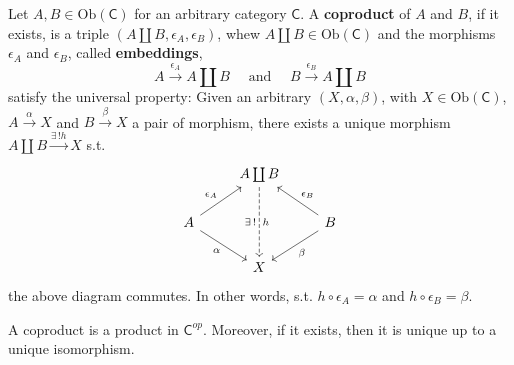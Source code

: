 \begin{defn}[Coproduct]
	Let $A,B \in \mathrm{Ob} \left(\mathsf{C}\right)$ for an arbitrary category $\mathsf{C}$.
	A \textbf{coproduct} of $A$ and $B$, if it exists, is a triple $\left(A \coprod B, \epsilon_A, \epsilon_B \right)$, whew $A \coprod B \in \mathrm{Ob} \left(\mathsf{C}\right)$ and the morphisms $\epsilon_A$ and $\epsilon_B$, called \textbf{embeddings}, 
	\begin{equation}
	A \xrightarrow{\epsilon_A} A \coprod B \quad \text{ and } \quad B \xrightarrow{\epsilon_B} A \coprod B
	\end{equation} 
	satisfy the universal property:
	Given an arbitrary $\left(X, \alpha, \beta\right)$, with $X \in \mathrm{Ob} \left(\mathsf{C}\right)$, $A \xrightarrow{\alpha} X$ and $B \xrightarrow{\beta} X$ a pair of morphism, there exists a unique morphism $A \coprod B \xrightarrow{\exists\, ! h} X$ s.t.
	\begin{equation}
	\begin{tikzcd}
		& A \coprod B \arrow[ld, "\epsilon_A"', leftarrow] \arrow[rd, "\epsilon_B", leftarrow] \arrow[dd, "h", "\exists\, !"', dashrightarrow] \\
		A & & B\\
		  & X \arrow[lu, "\alpha", leftarrow] \arrow[ru, "\beta"', leftarrow] &
	\end{tikzcd}
	\end{equation} 
	the above diagram commutes.
	In other words, s.t. $h \circ \epsilon_A = \alpha$ and $h \circ \epsilon_B = \beta$.
\end{defn}

\begin{rem}
	A coproduct is a product in $\mathsf{C}^{op}$.
	Moreover, if it exists, then it is unique up to a unique isomorphism.
\end{rem}

